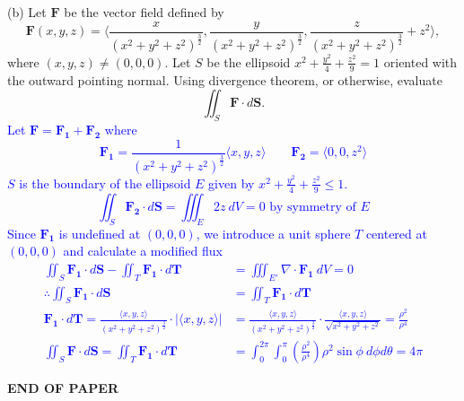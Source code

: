 \documentclass[12pt]{article}
\begin{document}
\newpage
(b) Let $\mathbf{F}$ be the vector field defined by
\[
\mathbf{F}(x,y,z)=\Bigg\langle\frac{x}{(x^2+y^2+z^2)^{\frac{3}{2}}},\frac{y}{(x^2+y^2+z^2)^{\frac{3}{2}}},\frac{z}{(x^2+y^2+z^2)^{\frac{3}{2}}}+z^2\Bigg\rangle,
\]
where $(x,y,z)\neq(0,0,0)$. Let $S$ be the ellipsoid $x^2+\frac{y^2}{4}+\frac{z^2}{9}=1$ oriented with the outward pointing normal. Using divergence theorem, or otherwise, evaluate
\[
\iint_S\mathbf{F}\cdot d\mathbf{S}.
\]
\textcolor{blue}{
Let $\mathbf{F}=\mathbf{F_1}+\mathbf{F_2}$ where
\[
\mathbf{F_1}=\frac{1}{(x^2+y^2+z^2)^\frac{3}{2}}\langle x,y,z\rangle\qquad\mathbf{F_2}=\langle0,0,z^2\rangle
\]
$S$ is the boundary of the ellipsoid $E$ given by $x^2+\frac{y^2}{4}+\frac{z^2}{9}\leq1$.
\[
	\iint_S\mathbf{F_2}\cdot d\mathbf{S}=\iiint_E2z\ dV=0\text{ by symmetry of }E
\]
Since $\mathbf{F_1}$ is undefined at $(0,0,0)$, we introduce a unit sphere $T$ centered at $(0,0,0)$ and calculate a modified flux
\begin{align*}
	\iint_S\mathbf{F_1}\cdot d\mathbf{S}-\iint_T\mathbf{F_1}\cdot d\mathbf{T}&=\iiint_{E'}\nabla\cdot\mathbf{F_1}\ dV=0\\
	\therefore\iint_S\mathbf{F_1}\cdot d\mathbf{S}&=\iint_T\mathbf{F_1}\cdot d\mathbf{T}\\
	\mathbf{F_1}\cdot d\mathbf{T}=\frac{\langle x,y,z\rangle}{(x^2+y^2+z^2)^\frac{3}{2}}\cdot|\langle x,y,z\rangle|&=\frac{\langle x,y,z\rangle}{(x^2+y^2+z^2)^\frac{3}{2}}\cdot\frac{\langle x,y,z\rangle}{\sqrt{x^2+y^2+z^2}}=\frac{\rho^2}{\rho^4}\\
	\iint_S\mathbf{F}\cdot d\mathbf{S}=\iint_T\mathbf{F_1}\cdot d\mathbf{T}&=\int_0^{2\pi}\int_0^{\pi}\left(\frac{\rho^2}{\rho^4}\right)\rho^2\sin\phi\ d\phi d\theta=4\pi
\end{align*}
}



\begin{center}
	\textbf{END OF PAPER}
\end{center}
\end{document}
